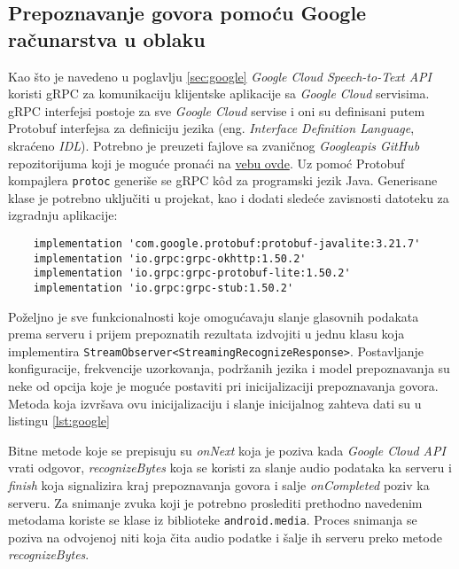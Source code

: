 \documentclass[struktura.tex]{subfiles}
\begin{document}
\subsection{Prepoznavanje govora pomoću Google računarstva u oblaku}
Kao što je navedeno u poglavlju \ref{sec:google} \textit{Google Cloud Speech-to-Text API} koristi gRPC za komunikaciju klijentske aplikacije sa \textit{Google Cloud} servisima. gRPC interfejsi postoje za sve \textit{Google Cloud} servise i oni su definisani putem Protobuf interfejsa za definiciju jezika (eng. \textit{Interface Definition Language}, skraćeno \textit{IDL}). Potrebno je preuzeti fajlove sa zvaničnog \textit{Googleapis GitHub} repozitorijuma koji je moguće pronaći na \href{https://github.com/googleapis/googleapis/tree/master/google/cloud/speech}{vebu ovde}. Uz pomoć Protobuf kompajlera \verb|protoc| generiše se gRPC k\^{o}d za programski jezik Java. Generisane klase je potrebno uključiti u projekat, kao i dodati sledeće zavisnosti datoteku za izgradnju aplikacije:
\begin{verbatim}
    implementation 'com.google.protobuf:protobuf-javalite:3.21.7'
    implementation 'io.grpc:grpc-okhttp:1.50.2'
    implementation 'io.grpc:grpc-protobuf-lite:1.50.2'
    implementation 'io.grpc:grpc-stub:1.50.2' 
\end{verbatim}

Poželjno je sve funkcionalnosti koje omogućavaju slanje glasovnih podakata prema serveru i prijem prepoznatih rezultata izdvojiti u jednu klasu koja implementira \verb|StreamObserver<StreamingRecognizeResponse>|. Postavljanje konfiguracije, frekvencije uzorkovanja, podržanih jezika i model prepoznavanja su neke od opcija koje je moguće postaviti pri inicijalizaciji prepoznavanja govora. Metoda koja izvršava ovu inicijalizaciju i slanje inicijalnog zahteva dati su u listingu \ref{lst:google}




Bitne metode koje se prepisuju su \textit{onNext} koja je poziva kada \textit{Google Cloud API} vrati odgovor, \textit{recognizeBytes} koja se koristi za slanje audio podataka ka serveru i \textit{finish} koja signalizira kraj prepoznavanja govora i salje \textit{onCompleted} poziv ka serveru. Za snimanje zvuka koji je potrebno proslediti prethodno navedenim metodama koriste se klase iz biblioteke \verb|android.media|. Proces snimanja se poziva na odvojenoj niti koja čita audio podatke i šalje ih serveru preko metode \textit{recognizeBytes}.
\end{document}
